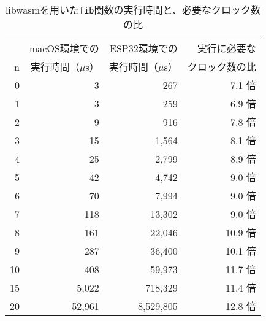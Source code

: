 \begin{table}[htbp]
  \caption{libwasmを用いた{\tt fib}関数の実行時間と、必要なクロック数の比}
  \label{tab:fib_time}
  \begin{center}
    \begin{tabular}{rrrr}
      \hline
         & macOS環境での & ESP32環境での & 実行に必要な \\
       n & 実行時間（$\mu$s） & 実行時間（$\mu$s） & クロック数の比 \\ \hline \hline
       0 &         3 &           267 &  7.1 倍 \\ \hline
       1 &         3 &           259 &  6.9 倍 \\ \hline
       2 &         9 &           916 &  7.8 倍 \\ \hline
       3 &        15 &         1,564 &  8.1 倍 \\ \hline
       4 &        25 &         2,799 &  8.9 倍 \\ \hline
       5 &        42 &         4,742 &  9.0 倍 \\ \hline
       6 &        70 &         7,994 &  9.0 倍 \\ \hline
       7 &       118 &        13,302 &  9.0 倍 \\ \hline
       8 &       161 &        22,046 & 10.9 倍 \\ \hline
       9 &       287 &        36,400 & 10.1 倍 \\ \hline
      10 &       408 &        59,973 & 11.7 倍 \\ \hline
      15 &     5,022 &       718,329 & 11.4 倍 \\ \hline
      20 &    52,961 &     8,529,805 & 12.8 倍 \\ \hline

\end{tabular}
\end{center}
\end{table}
